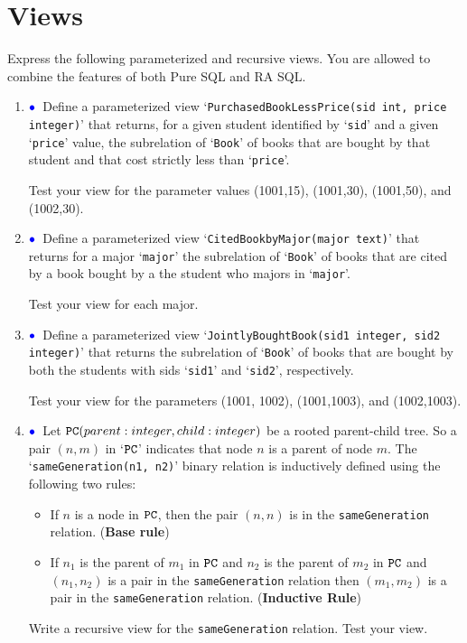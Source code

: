 \documentclass[11pt]{article}
\newcommand{\blue}[1]{{\color{blue}#1}}
\newcommand{\bluebullet}{$\blue{\bullet}$}
\begin{document}
\section{Views}


Express the following parameterized and recursive views. You are allowed to combine the features of both Pure SQL and RA SQL.

\begin{enumerate}[resume]

           
\item\label{viewone} \bluebullet\  Define a parameterized view `{\tt PurchasedBookLessPrice(sid int, price integer)}' that returns, for a given student
identified by `{\tt sid}' and a given `{\tt price}' value, the subrelation of
`{\tt Book}' of books that are bought by that student and that cost strictly less than `{\tt price}'.

Test your view for the parameter values (1001,15), (1001,30), (1001,50), and (1002,30).

\item \bluebullet\ Define a parameterized view `{\tt CitedBookbyMajor(major text)}' that returns for a major `{\tt major}'
the subrelation of `{\tt Book}' of books that are cited by a book bought by a the student who majors in `{\tt major}'.

Test your view for each major.

\item \bluebullet\ Define a parameterized view `{\tt JointlyBoughtBook(sid1 integer, sid2 integer)}' that returns the subrelation of `{\tt Book}' of books
that are bought by both the students with sids `{\tt sid1}' and `{\tt sid2}', respectively.

Test your view for the parameters (1001, 1002), (1001,1003), and (1002,1003).


\item \bluebullet\  Let ${\tt PC}(parent: integer, child: integer)$ be a rooted parent-child tree.   So a pair $(n,m)$ in `${\tt PC}$' indicates that node $n$ is a parent of node $m$.
The `{\tt sameGeneration(n1, n2)}' binary relation is inductively defined using the following two rules:
\begin{itemize}
\item If $n$ is a node in ${\tt PC}$, then the pair $(n,n)$ is in the {\tt sameGeneration} relation. ({\bf Base rule})
\item If $n_1$ is the parent of $m_1$ in ${\tt PC}$ and $n_2$ is the parent of $m_2$ in ${\tt PC}$ and 
$(n_1,n_2)$ is a pair in the {\tt sameGeneration} relation then $(m_1,m_2)$ is a pair in the {\tt sameGeneration} relation. ({\bf Inductive Rule})
\end{itemize}

Write a \blue{recursive view} for the {\tt sameGeneration} relation.
Test your view.

\end{enumerate}
\end{document}
